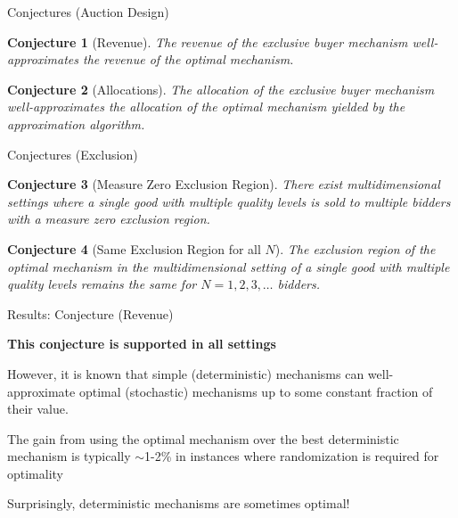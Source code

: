 \documentclass[aspectratio=169,xcolor=dvipsnames]{beamer}
\newtheorem{conjecture}{Conjecture}
\begin{document}

\begin{frame}{Conjectures (Auction Design)}

\vspace{5mm}
\begin{conjecture}[Revenue]\label{conj_rev}
The revenue of the exclusive buyer mechanism well-approximates the revenue of the optimal mechanism.
\end{conjecture}

\vspace{5mm}
\begin{conjecture}[Allocations]\label{conj_alloc}
The allocation of the exclusive buyer mechanism well-approximates the allocation of the optimal mechanism yielded by the approximation algorithm.
\end{conjecture}

\end{frame}


\begin{frame}{Conjectures (Exclusion)}

\vspace{5mm}
\begin{conjecture}[Measure Zero Exclusion Region]\label{conj_excl_zero}
There exist multidimensional settings where a single good with multiple quality levels is sold to multiple bidders with a measure zero exclusion region.
\end{conjecture}

\vspace{5mm}
\begin{conjecture}[Same Exclusion Region for all $N$]\label{conj_excl_n}
The exclusion region of the optimal mechanism in the multidimensional setting of a single good with multiple quality levels remains the same for $N=1,2,3,\dots$ bidders. 
\end{conjecture}

\end{frame}


\begin{frame}{Results: Conjecture (Revenue)}

\textbf{This conjecture is supported in all settings}

\vspace{5mm}
However, it is known that simple (deterministic) mechanisms can well-approximate optimal (stochastic) mechanisms up to some constant fraction of their value.

\vspace{5mm}
The gain from using the optimal mechanism over the best deterministic mechanism is typically $\sim$1-2\% in instances where randomization is required for optimality

\vspace{5mm}
{\color{red} Surprisingly, deterministic mechanisms are sometimes optimal!}

\end{frame}
\end{document}
